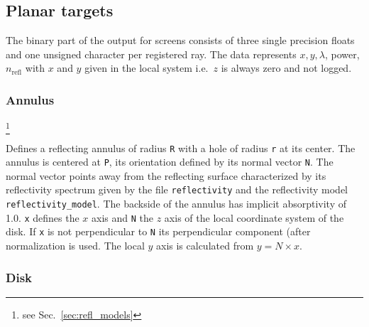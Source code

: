 \documentclass[10pt,a4paper,titlepage]{article}
\begin{document}
\subsection{Planar targets}

The binary part of the output for screens consists of three single precision floats and one unsigned character per registered ray. The data represents $x, y, \lambda$, power, $n_{\mathrm{refl}}$ with $x$ and $y$ given in the local system i.e.\ $z$ is always zero and not logged.


\subsubsection{Annulus}









\footnote{see Sec.~\ref{sec:refl_models}}

\vspace{0.25cm}
Defines a reflecting annulus of radius {\tt R} with a hole of radius {\tt r} at its center. The annulus is centered at {\tt P}, its orientation defined by its normal vector {\tt N}. The normal vector points away from the reflecting surface characterized by its reflectivity spectrum given by the file {\tt reflectivity} and the reflectivity model {\tt reflectivity\_model}. The backside of the annulus has implicit absorptivity of 1.0. {\tt x} defines the $x$ axis and {\tt N} the $z$ axis of the local coordinate system of the disk. If {\tt x} is not perpendicular to {\tt N} its perpendicular component (after normalization is used. The local $y$ axis is calculated from $y = N \times x$.

\subsubsection{Disk}


\end{document}

